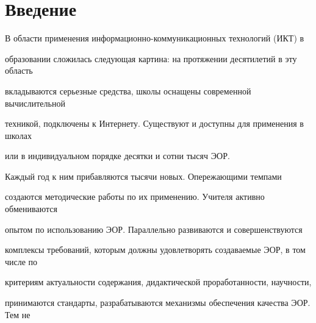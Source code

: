 












      \thispagestyle{headings}





      


            \label{st\stat}


            


            \vspace*{-12pt}





\section{Введение}





В области применения информационно-коммуникационных технологий (ИКТ) в 


образовании сложилась следующая картина: на протяжении десятилетий в эту область 


вкладываются серьезные средства, школы оснащены современной вычислительной 


техникой, подключены к Интернету. Существуют и доступны для применения в школах 


или в индивидуальном порядке десятки и сотни тысяч ЭОР. 


Каждый год к ним прибавляются тысячи новых. Опережающими темпами 


создаются методические работы по их применению. Учителя активно обмениваются 


опытом по использованию ЭОР. Параллельно развиваются и совершенствуются 


комплексы требований, которым должны удовлетворять создаваемые ЭОР, в том числе по 


критериям актуальности содержания, дидактической проработанности, научности, 


принимаются стандарты, разрабатываются механизмы обеспечения качества ЭОР. Тем не 


